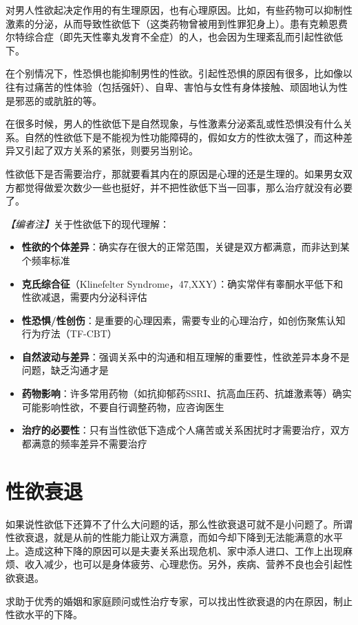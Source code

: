 对男人性欲起决定作用的有生理原因，也有心理原因。比如，有些药物可以抑制性激素的分泌，从而导致性欲低下（这类药物曾被用到性罪犯身上）。患有克赖恩费尔特综合症（即先天性睾丸发育不全症）的人，也会因为生理紊乱而引起性欲低下。

在个别情况下，性恐惧也能抑制男性的性欲。引起性恐惧的原因有很多，比如像以往有过痛苦的性体验（包括强奸）、自卑、害怕与女性有身体接触、顽固地认为性是邪恶的或肮脏的等。

在很多时候，男人的性欲低下是自然现象，与性激素分泌紊乱或性恐惧没有什么关系。自然的性欲低下是不能视为性功能障碍的，假如女方的性欲太强了，而这种差异又引起了双方关系的紧张，则要另当别论。

性欲低下是否需要治疗，那就要看其内在的原因是心理的还是生理的。如果男女双方都觉得做爱次数少一些也挺好，并不把性欲低下当一回事，那么治疗就没有必要了。

\noindent\textit{【编者注】}关于性欲低下的现代理解：
\begin{itemize}
	\item \textbf{性欲的个体差异}：确实存在很大的正常范围，关键是双方都满意，而非达到某个频率标准
	\item \textbf{克氏综合征}（Klinefelter Syndrome，47,XXY）：确实常伴有睾酮水平低下和性欲减退，需要内分泌科评估
	\item \textbf{性恐惧/性创伤}：是重要的心理因素，需要专业的心理治疗，如创伤聚焦认知行为疗法（TF-CBT）
	\item \textbf{自然波动与差异}：强调关系中的沟通和相互理解的重要性，性欲差异本身不是问题，缺乏沟通才是
	\item \textbf{药物影响}：许多常用药物（如抗抑郁药SSRI、抗高血压药、抗雄激素等）确实可能影响性欲，不要自行调整药物，应咨询医生
	\item \textbf{治疗的必要性}：只有当性欲低下造成个人痛苦或关系困扰时才需要治疗，双方都满意的频率差异不需要治疗
\end{itemize}

\section{性欲衰退}

如果说性欲低下还算不了什么大问题的话，那么性欲衰退可就不是小问题了。所谓性欲衰退，就是从前的性能力能让双方满意，而如今却下降到无法能满意的水平上。造成这种下降的原因可以是夫妻关系出现危机、家中添人进口、工作上出现麻烦、收入减少，也可以是身体疲劳、心理悲伤。另外，疾病、营养不良也会引起性欲衰退。

求助于优秀的婚姻和家庭顾问或性治疗专家，可以找出性欲衰退的内在原因，制止性欲水平的下降。

